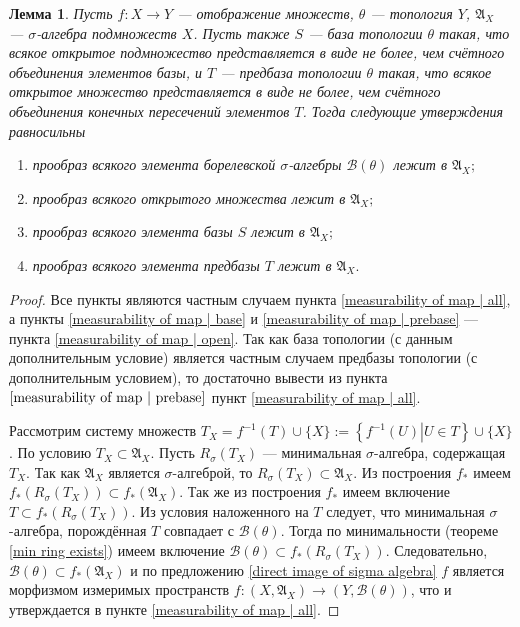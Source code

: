 \documentclass[12pt]{article}
\newtheorem{lemma}[theorem]{Лемма}
\numberwithin{theorem}{section}
\theoremstyle{definition}
\newcommand{\setsigmaalg}{\mathfrak{A}}
\newcommand{\calB}{\mathcal{B}}
\newcommand{\defineset}[2]{\left\{
	\left.
	#1
	\right\vert
	#2
	\right\}}
\begin{document}
	\begin{lemma} \label{measurability of map}
		Пусть $ f \colon X \to Y $ --- отображение множеств,
		$ \theta $ --- топология $ Y $, $ \setsigmaalg_X $ --- $ \sigma $-алгебра подмножеств $ X $.
		Пусть также $ S $ --- база топологии $ \theta $ такая, 
		что всякое открытое подмножество представляется в виде не более, чем счётного объединения элементов базы, 
		и $ T $ --- предбаза топологии $ \theta $ такая, что всякое открытое множество представляется в виде не
		более, чем счётного объединения конечных пересечений элементов $ T $.
		Тогда следующие утверждения равносильны
		\begin{enumerate}
			\item прообраз всякого элемента борелевской $ \sigma $-алгебры $ \calB(\theta) $ лежит в $ \setsigmaalg_X; $ \label{measurability of map | all}
			\item прообраз всякого открытого множества лежит в $ \setsigmaalg_X; $ \label{measurability of map | open}
			\item прообраз всякого элемента базы $ S $ лежит в $ \setsigmaalg_X; $ \label{measurability of map | base}
			\item прообраз всякого элемента предбазы $ T $ лежит в $ \setsigmaalg_X. $ \label{measurability of map | prebase}
		\end{enumerate}
	\end{lemma}
	
	\begin{proof}
		Все пункты являются частным случаем пункта \ref{measurability of map | all},
		а пункты \ref{measurability of map | base} и \ref{measurability of map | prebase}
		--- пункта \ref{measurability of map | open}.
		Так как база топологии (с данным дополнительным условие) 
		является частным случаем предбазы топологии (с дополнительным условием),
		то достаточно вывести из пункта $ \ref{measurability of map | prebase} $
		пункт \ref{measurability of map | all}.
		
		Рассмотрим систему множеств $ T_X = f^{-1}(T) \cup \{X\} := \defineset{f^{-1}(U)}{U \in T} \cup \{X\} $.
		По условию $ T_X \subset \setsigmaalg_X $. Пусть $ R_{\sigma}(T_X) $ --- минимальная $ \sigma $-алгебра, содержащая $ T_X $.
		Так как $ \setsigmaalg_X $ является $ \sigma $-алгеброй, то $ R_{\sigma}(T_X) \subset \setsigmaalg_X $.
		Из построения $ f_* $ имеем $ f_*(R_{\sigma}(T_X)) \subset f_*(\setsigmaalg_X) $.
		Так же из построения $ f_* $ имеем включение $ T \subset f_*(R_{\sigma}(T_X)) $.
		Из условия наложенного на $ T $ следует, что минимальная $ \sigma $-алгебра, порождённая $ T $
		совпадает с $ \calB(\theta) $. Тогда по минимальности (теореме \ref{min ring exists})
		имеем включение $ \calB(\theta) \subset f_*(R_{\sigma}(T_X)) $.
		Следовательно, $ \calB(\theta) \subset f_{*}(\setsigmaalg_X) $ и по предложению \ref{direct image of sigma algebra}
		$ f $ является морфизмом измеримых пространств $ f \colon (X, \setsigmaalg_X) \to (Y, \calB(\theta)) $,
		что и утверждается в пункте \ref{measurability of map | all}.
	\end{proof}
	
\end{document}
